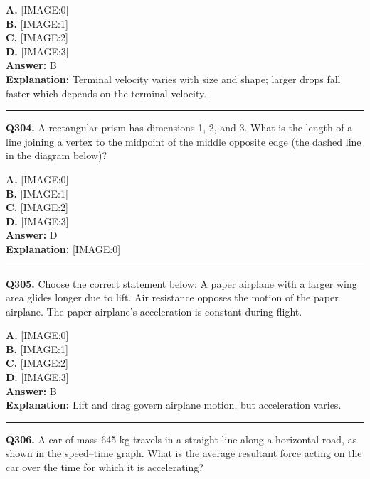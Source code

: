 \documentclass[12pt]{article}
\begin{document}
\textbf{A.} [IMAGE:0] \\
\textbf{B.} [IMAGE:1] \\
\textbf{C.} [IMAGE:2] \\
\textbf{D.} [IMAGE:3] \\

\textbf{Answer:} B \\
\textbf{Explanation:} Terminal velocity varies with size and shape; larger drops fall faster which depends on the terminal velocity.

\hrule
\vspace{1em}


\noindent
\textbf{Q304.} A rectangular prism has dimensions 1, 2, and 3. What is the length of a line joining a vertex to the midpoint of the middle opposite edge (the dashed line in the diagram below)?



\textbf{A.} [IMAGE:0] \\
\textbf{B.} [IMAGE:1] \\
\textbf{C.} [IMAGE:2] \\
\textbf{D.} [IMAGE:3] \\

\textbf{Answer:} D \\
\textbf{Explanation:} [IMAGE:0]

\hrule
\vspace{1em}


\noindent
\textbf{Q305.} Choose the correct statement below:
A paper airplane with a larger wing area glides longer due to lift.
Air resistance opposes the motion of the paper airplane.
The paper airplane’s acceleration is constant during flight.



\textbf{A.} [IMAGE:0] \\
\textbf{B.} [IMAGE:1] \\
\textbf{C.} [IMAGE:2] \\
\textbf{D.} [IMAGE:3] \\

\textbf{Answer:} B \\
\textbf{Explanation:} Lift and drag govern airplane motion, but acceleration varies.

\hrule
\vspace{1em}


\noindent
\textbf{Q306.} A car of mass 645 kg travels in a straight line along a horizontal road, as shown in the speed–time graph.
What is the average resultant force acting on the car over the time for which it is accelerating?
\end{document}
